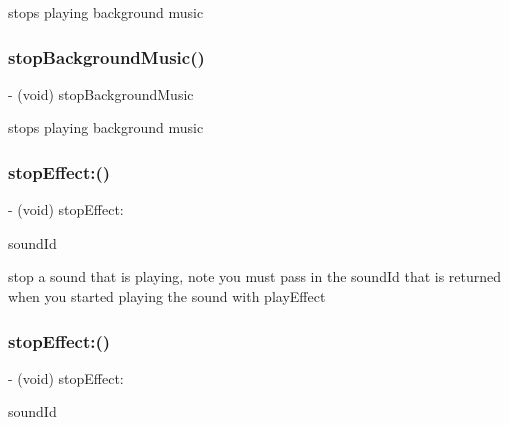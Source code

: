 stops playing background music \mbox{\label{interfaceSimpleAudioEngine_a81e61f21116fc8d46b8242e9caa48006}} 
\subsubsection{\texorpdfstring{stop\+Background\+Music()}{stopBackgroundMusic()}\hspace{0.1cm}{\footnotesize\ttfamily [4/4]}}
{\footnotesize\ttfamily -\/ (void) stop\+Background\+Music \begin{DoxyParamCaption}{ }\end{DoxyParamCaption}}

stops playing background music \mbox{\label{interfaceSimpleAudioEngine_a4d818613fe0acb6fa8dc9fac400327f0}} 
\subsubsection{\texorpdfstring{stop\+Effect\+:()}{stopEffect:()}\hspace{0.1cm}{\footnotesize\ttfamily [1/4]}}
{\footnotesize\ttfamily -\/ (void) stop\+Effect\+: \begin{DoxyParamCaption}\item[{(A\+Luint)}]{sound\+Id }\end{DoxyParamCaption}}

stop a sound that is playing, note you must pass in the sound\+Id that is returned when you started playing the sound with play\+Effect \mbox{\label{interfaceSimpleAudioEngine_a4d818613fe0acb6fa8dc9fac400327f0}} 
\subsubsection{\texorpdfstring{stop\+Effect\+:()}{stopEffect:()}\hspace{0.1cm}{\footnotesize\ttfamily [2/4]}}
{\footnotesize\ttfamily -\/ (void) stop\+Effect\+: \begin{DoxyParamCaption}\item[{(A\+Luint)}]{sound\+Id }\end{DoxyParamCaption}}

